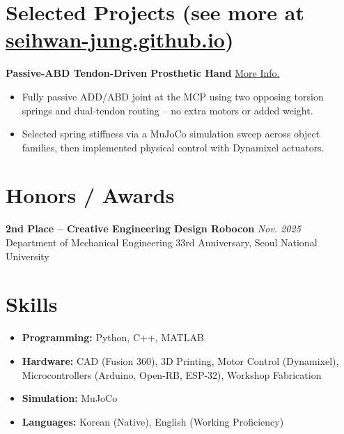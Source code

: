 \documentclass[10.5pt,a4paper]{article}
\begin{document}
\section*{Selected Projects \; \normalfont\normalsize(see more at \href{https://seihwan-jung.github.io/}{seihwan-jung.github.io})}
\textbf{Passive-ABD Tendon-Driven Prosthetic Hand} \hfill \href{https://seihwan-jung.github.io/research-passive-abd-hand.html}{More Info.}
\begin{itemize}
  \item Fully passive ADD/ABD joint at the MCP using two opposing torsion springs and dual-tendon routing -- no extra motors or added weight.
  \item Selected spring stiffness via a MuJoCo simulation sweep across object families, then implemented physical control with Dynamixel actuators.
\end{itemize}
\section*{Honors / Awards}
\textbf{2nd Place -- Creative Engineering Design Robocon} \hfill \textit{Nov. 2025}\\
Department of Mechanical Engineering 33rd Anniversary, Seoul National University
\section*{Skills}
\begin{itemize}
  \item \textbf{Programming:} Python, C++, MATLAB
  \item \textbf{Hardware:} CAD (Fusion 360), 3D Printing, Motor Control (Dynamixel), Microcontrollers (Arduino, Open-RB, ESP-32), Workshop Fabrication
  \item \textbf{Simulation:} MuJoCo
  \item \textbf{Languages:} Korean (Native), English (Working Proficiency)
\end{itemize}
\end{document}

